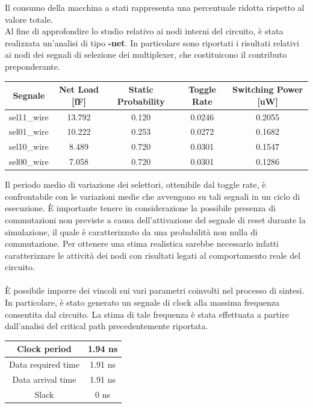 \documentclass[11pt,  english, makeidx, a4paper, titlepage, oneside]{book}
\begin{document}
\vspace{0.3cm}  
Il consumo della macchina a stati rappresenta una percentuale ridotta rispetto al valore totale.
\\
Al fine di approfondire lo studio relativo ai nodi interni del circuito, è stata realizzata un'analisi di tipo \textbf{-net}. In particolare sono riportati i risultati relativi ai nodi dei segnali di selezione dei multiplexer, che costituicono il contributo preponderante.
\\
\begin{center}
	\begin{tabular}{|c|c|c|c|c|}
	\hline
	Segnale & Net Load [fF] & Static Probability & Toggle Rate & Switching Power [uW] \\
	\hline
	 sel11\_wire & 13.792  &  0.120  &  0.0246  & 0.2055 \\
	\hline
	 sel01\_wire & 10.222  &  0.253  &  0.0272  & 0.1682 \\
	\hline
	sel10\_wire & 8.489  &  0.720  &  0.0301  & 0.1547\\
	\hline
	sel00\_wire & 7.058  &  0.720  &  0.0301  & 0.1286 \\
	\hline
	\end{tabular}	
\end{center}
\vspace{0.3cm}
Il periodo medio di variazione dei selettori, ottenibile dal toggle rate, è confrontabile con le variazioni medie che avvengono su tali segnali in un ciclo di esecuzione. È importante tenere in considerazione la possibile presenza di commutazioni non previste a causa dell'attivazione del segnale di reset durante la simulazione, il quale è caratterizzato da una probabilità non nulla di commutazione. Per ottenere una stima realistica sarebbe necessario infatti caratterizzare le attività dei nodi con risultati legati al comportamento reale del circuito.
\\\\
È possibile imporre dei vincoli sui vari parametri coinvolti nel processo di sintesi. In particolare, è stato generato un segnale di clock alla massima frequenza consentita dal circuito. La stima di tale frequenza è stata effettuata a partire dall'analisi del critical path precedentemente riportata.
\\
\begin{center}
	\begin{tabular}{|c|c|}
	\hline
	Clock period & 1.94 ns\\
	\hline
	Data required time & 1.91 ns \\
	\hline
	Data arrival time & 1.91 ns \\
	\hline
	Slack & 0 ns \\
	\hline
	\end{tabular}	
\end{center}
\end{document}
